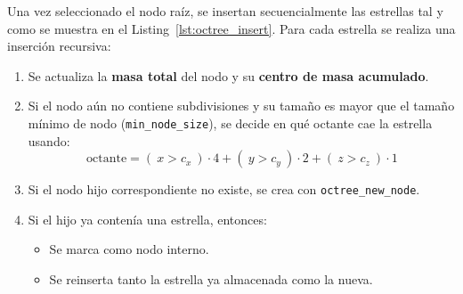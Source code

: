 Una vez seleccionado el nodo raíz, se insertan secuencialmente las estrellas tal y como se muestra en el Listing~\ref{lst:octree_insert}.
Para cada estrella se realiza una inserción recursiva:
\begin{enumerate}
    \item Se actualiza la \textbf{masa total} del nodo y su \textbf{centro de masa acumulado}.
    \item Si el nodo aún no contiene subdivisiones y su tamaño es mayor que el tamaño mínimo de nodo (\texttt{min\_node\_size}), se decide en qué octante cae la estrella usando:
    \[
        \mathrm{octante} =
        (\ x > c_x\ ) \cdot 4 +
        (\ y > c_y\ ) \cdot 2 +
        (\ z > c_z\ ) \cdot 1
    \]
    \item Si el nodo hijo correspondiente no existe, se crea con \texttt{octree\_new\_node}.
    \item Si el hijo ya contenía una estrella, entonces:
    \begin{itemize}
        \item Se marca como nodo interno.
        \item Se reinserta tanto la estrella ya almacenada como la nueva.
    \end{itemize}
\end{enumerate}
